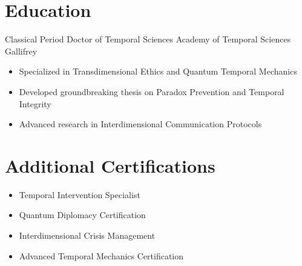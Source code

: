 \section*{Education}
\cventry
{Classical Period}
{Doctor of Temporal Sciences}
{Academy of Temporal Sciences}
{Gallifrey}
{%
  \begin{itemize}
    \item Specialized in Transdimensional Ethics and Quantum Temporal Mechanics
    \item Developed groundbreaking thesis on Paradox Prevention and Temporal Integrity
    \item Advanced research in Interdimensional Communication Protocols
  \end{itemize}
}{}
\section*{Additional Certifications}
\begin{itemize}
  \item Temporal Intervention Specialist
  \item Quantum Diplomacy Certification
  \item Interdimensional Crisis Management
  \item Advanced Temporal Mechanics Certification
\end{itemize}
